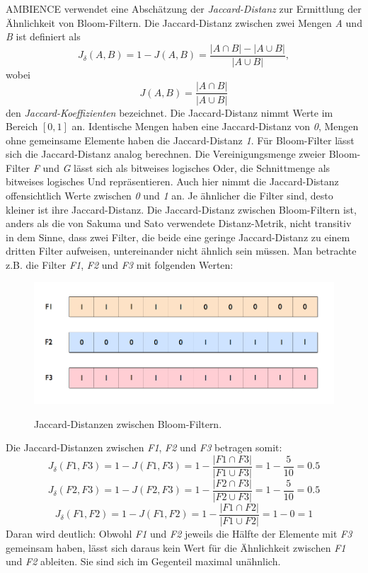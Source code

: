AMBIENCE verwendet eine Abschätzung der \textit{Jaccard-Distanz} zur Ermittlung der Ähnlichkeit von Bloom-Filtern. Die Jaccard-Distanz zwischen zwei Mengen \textit{A} und \textit{B} ist definiert als 
\[J_{\delta}(A,B) = 1 - J(A,B) = \frac{|A\cap B| - |A\cup B|}{|A\cup B|}, \]
wobei 
\[J(A,B) = \frac{|A\cap B|}{|A\cup B|}\] den \textit{Jaccard-Koeffizienten} bezeichnet. Die Jaccard-Distanz nimmt Werte im Bereich $\left[0,1\right]$ an. Identische Mengen haben eine Jaccard-Distanz von \textit{0}, Mengen ohne gemeinsame Elemente haben die Jaccard-Distanz \textit{1}. 
Für Bloom-Filter lässt sich die Jaccard-Distanz analog berechnen. Die Vereinigungsmenge zweier Bloom-Filter \textit{F} und \textit{G} lässt sich als bitweises logisches Oder, die Schnittmenge als bitweises logisches Und repräsentieren. Auch hier nimmt die Jaccard-Distanz offensichtlich Werte zwischen \textit{0} und \textit{1} an. Je ähnlicher die Filter sind, desto kleiner ist ihre Jaccard-Distanz. 
Die Jaccard-Distanz zwischen Bloom-Filtern ist, anders als die von Sakuma und Sato verwendete Distanz-Metrik, nicht transitiv in dem Sinne, dass zwei Filter, die beide eine geringe Jaccard-Distanz zu einem dritten Filter aufweisen, untereinander nicht ähnlich sein müssen. Man betrachte z.B. die Filter \textit{F1}, \textit{F2} und \textit{F3} mit folgenden Werten: 
\begin{figure}[hpbt]
  \centering
  \includegraphics[width=1.0\textwidth]{pictures/filters.png}\\
  \caption[Jaccard-Distanzen zwischen Bloom-Filtern]{Jaccard-Distanzen zwischen Bloom-Filtern.}\label{fig:pic1}
\end{figure}
\newpage
\noindent
Die Jaccard-Distanzen zwischen \textit{F1}, \textit{F2} und \textit{F3} betragen somit: 
\[J_{\delta}(F1,F3) = 1 - J(F1,F3) = 1 - \frac{|F1\cap F3|}{|F1\cup F3|} = 1 - \frac{5}{10} = 0.5\]
\[J_{\delta}(F2,F3) = 1 - J(F2,F3) = 1 - \frac{|F2\cap F3|}{|F2\cup F3|} = 1 - \frac{5}{10} = 0.5\]
\[J_{\delta}(F1,F2) = 1 - J(F1,F2) = 1 - \frac{|F1\cap F2|}{|F1\cup F2|} = 1 - 0 = 1\]
Daran wird deutlich: Obwohl \textit{F1} und \textit{F2} jeweils die Hälfte der Elemente mit \textit{F3} gemeinsam haben, lässt sich daraus kein Wert für die Ähnlichkeit zwischen \textit{F1} und \textit{F2} ableiten. Sie sind sich im Gegenteil maximal unähnlich. 
